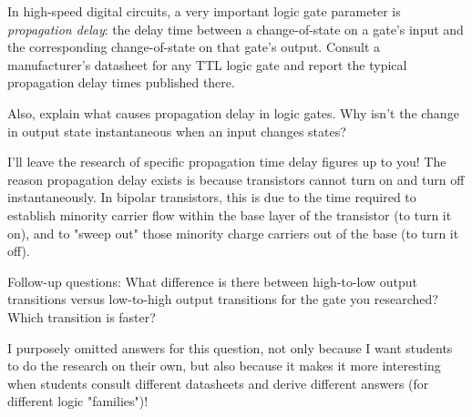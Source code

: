 

In high-speed digital circuits, a very important logic gate parameter is {\it propagation delay}: the delay time between a change-of-state on a gate's input and the corresponding change-of-state on that gate's output.  Consult a manufacturer's datasheet for any TTL logic gate and report the typical propagation delay times published there.

Also, explain what causes propagation delay in logic gates.  Why isn't the change in output state instantaneous when an input changes states?







I'll leave the research of specific propagation time delay figures up to you!  The reason propagation delay exists is because transistors cannot turn on and turn off instantaneously.  In bipolar transistors, this is due to the time required to establish minority carrier flow within the base layer of the transistor (to turn it on), and to "sweep out" those minority charge carriers out of the base (to turn it off).

\vskip 10pt

Follow-up questions: What difference is there between high-to-low output transitions versus low-to-high output transitions for the gate you researched?  Which transition is faster?







I purposely omitted answers for this question, not only because I want students to do the research on their own, but also because it makes it more interesting when students consult different datasheets and derive different answers (for different logic "families")!




